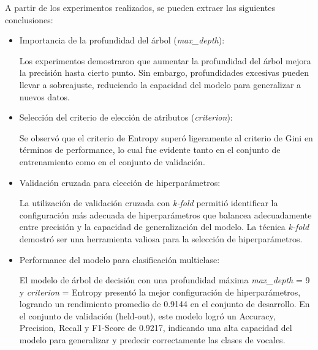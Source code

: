 \documentclass[11pt,a4paper, twocolumn]{article}
\begin{document}
A partir de los experimentos realizados, se pueden extraer las siguientes conclusiones:

\begin{itemize}
	
	\item
		Importancia de la profundidad del árbol (\textit{max\_depth}):

		Los experimentos demostraron que aumentar la profundidad del árbol mejora la precisión hasta cierto punto. Sin embargo, profundidades excesivas pueden llevar a sobreajuste, reduciendo la capacidad del modelo para generalizar a nuevos datos.

	\item
		Selección del criterio de elección de atributos (\textit{criterion}):

		Se observó que el criterio de Entropy superó ligeramente al criterio de Gini en términos de performance, lo cual fue evidente tanto en el conjunto de entrenamiento como en el conjunto de validación.

	\item
		Validación cruzada para elección de hiperparámetros:

		La utilización de validación cruzada con \textit{k-fold} permitió identificar la configuración más adecuada de hiperparámetros que balancea adecuadamente entre precisión y la capacidad de generalización del modelo.  
		La técnica \textit{k-fold} demostró ser una herramienta valiosa para la selección de hiperparámetros.

	\item
		Performance del modelo para clasificación multiclase:

		El modelo de árbol de decisión con una profundidad máxima \textit{max\_depth} = 9 y \textit{criterion} = Entropy presentó la mejor configuración de hiperparámetros, logrando un rendimiento promedio de 0.9144 en el conjunto de desarrollo.
		En el conjunto de validación (held-out), este modelo logró un Accuracy, Precision, Recall y F1-Score de 0.9217, indicando una alta capacidad del modelo para generalizar y predecir correctamente las clases de vocales. 

\end{itemize}
\end{document}
